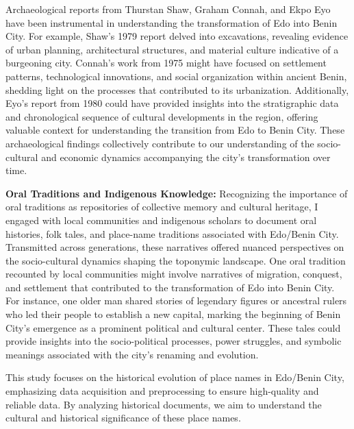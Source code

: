 Archaeological reports from Thurstan Shaw, Graham Connah, and Ekpo Eyo have been instrumental in understanding the transformation of Edo into Benin City. For example, Shaw's 1979 report delved into excavations, revealing evidence of urban planning, architectural structures, and material culture indicative of a burgeoning city. Connah's work from 1975 might have focused on settlement patterns, technological innovations, and social organization within ancient Benin, shedding light on the processes that contributed to its urbanization. Additionally, Eyo's report from 1980 could have provided insights into the stratigraphic data and chronological sequence of cultural developments in the region, offering valuable context for understanding the transition from Edo to Benin City. These archaeological findings collectively contribute to our understanding of the socio-cultural and economic dynamics accompanying the city's transformation over time.

\textbf{Oral Traditions and Indigenous Knowledge:} Recognizing the importance of oral traditions as repositories of collective memory and cultural heritage, I engaged with local communities and indigenous scholars to document oral histories, folk tales, and place-name traditions associated with Edo/Benin City. Transmitted across generations, these narratives offered nuanced perspectives on the socio-cultural dynamics shaping the toponymic landscape. One oral tradition recounted by local communities might involve narratives of migration, conquest, and settlement that contributed to the transformation of Edo into Benin City. For instance, one older man shared stories of legendary figures or ancestral rulers who led their people to establish a new capital, marking the beginning of Benin City's emergence as a prominent political and cultural center. These tales could provide insights into the socio-political processes, power struggles, and symbolic meanings associated with the city's renaming and evolution.

This study focuses on the historical evolution of place names in Edo/Benin City, emphasizing data acquisition and preprocessing to ensure high-quality and reliable data. By analyzing historical documents, we aim to understand the cultural and historical significance of these place names.

